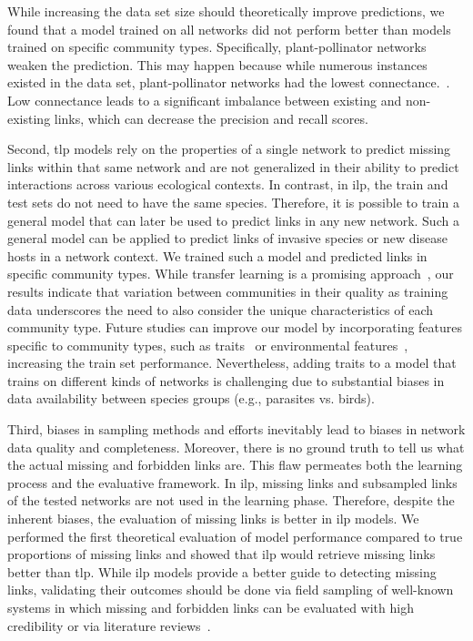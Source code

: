 \documentclass[oneside, a4paper, onecolumn, 11pt]{article}
\begin{document}
\begin{refsection}
While increasing the data set size should theoretically improve predictions, we found that a model trained on all networks did not perform better than models trained on specific community types. Specifically, plant-pollinator networks weaken the prediction. This may happen because while numerous instances existed in the data set, plant-pollinator networks had the lowest connectance.~\autocite{Galkin2022-il}. Low connectance leads to a significant imbalance between existing and non-existing links, which can decrease the precision and recall scores.  

Second, \ac{tlp} models rely on the properties of a single network to predict missing links within that same network and are not generalized in their ability to predict interactions across various ecological contexts. In contrast, in \ac{ilp}, the train and test sets do not need to have the same species. Therefore, it is possible to train a general model that can later be used to predict links in any new network. Such a general model can be applied to predict links of invasive species or new disease hosts in a network context. We trained such a model and predicted links in specific community types. While transfer learning is a promising approach~\autocite{Strydom2023-nb,Caron2024-jf}, our results indicate that variation between communities in their quality as training data underscores the need to also consider the unique characteristics of each community type. Future studies can improve our model by incorporating features specific to community types, such as traits~\autocite{Pichler2020-bg,Benadi2022-yv,Caron2024-jf} or environmental features~\autocite{Song2020-wn}, increasing the train set performance. Nevertheless, adding traits to a model that trains on different kinds of networks is challenging due to substantial biases in data availability between species groups (e.g., parasites vs. birds). 

Third, biases in sampling methods and efforts inevitably lead to biases in network data quality and completeness. Moreover, there is no ground truth to tell us what the actual missing and forbidden links are. This flaw permeates both the learning process and the evaluative framework. In \ac{ilp}, missing links and subsampled links of the tested networks are not used in the learning phase. Therefore, despite the inherent biases, the evaluation of missing links is better in \ac{ilp} models. We performed the first theoretical evaluation of model performance compared to true proportions of missing links and showed that \ac{ilp} would retrieve missing links better than \ac{tlp}. While \ac{ilp} models provide a better guide to detecting missing links, validating their outcomes should be done via field sampling of well-known systems in which missing and forbidden links can be evaluated with high credibility or via literature reviews~\autocite{Farrell2022-nn}. 


\end{refsection}
\end{document}
